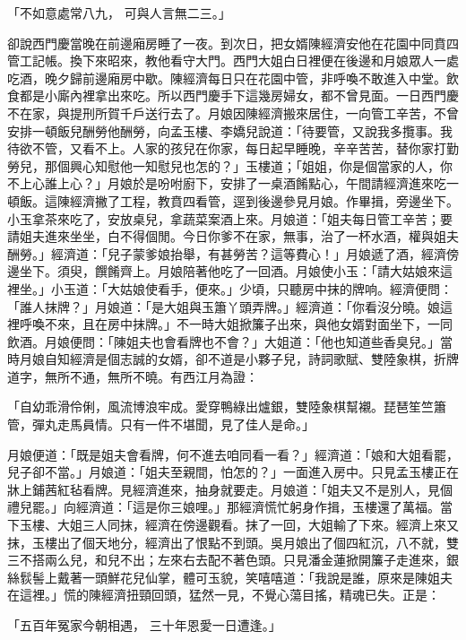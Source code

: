 「不如意處常八九，  可與人言無二三。」

卻說西門慶當晚在前邊廂房睡了一夜。到次日，把女婿陳經濟安他在花園中同賁四管工記帳。換下來昭來，教他看守大門。西門大姐白日裡便在後邊和月娘眾人一處吃酒，晚夕歸前邊廂房中歇。陳經濟每日只在花園中管，非呼喚不敢進入中堂。飲食都是小廝內裡拿出來吃。所以西門慶手下這幾房婦女，都不曾見面。一日西門慶不在家，與提刑所賀千戶送行去了。月娘因陳經濟搬來居住，一向管工辛苦，不曾安排一頓飯兒酬勞他酬勞，向孟玉樓、李嬌兒說道：「待要管，又說我多攬事。我待欲不管，又看不上。人家的孩兒在你家，每日起早睡晚，辛辛苦苦，替你家打勤勞兒，那個興心知慰他一知慰兒也怎的？」玉樓道；「姐姐，你是個當家的人，你不上心誰上心？」月娘於是吩咐廚下，安排了一桌酒餚點心，午間請經濟進來吃一頓飯。這陳經濟撇了工程，教賁四看管，逕到後邊參見月娘。作畢揖，旁邊坐下。小玉拿茶來吃了，安放桌兒，拿蔬菜案酒上來。月娘道：「姐夫每日管工辛苦；要請姐夫進來坐坐，白不得個閒。今日你爹不在家，無事，治了一杯水酒，權與姐夫酬勞。」經濟道：「兒子蒙爹娘抬舉，有甚勞苦？這等費心！」月娘遞了酒，經濟傍邊坐下。須臾，饌餚齊上。月娘陪著他吃了一回酒。月娘使小玉：「請大姑娘來這裡坐。」小玉道：「大姑娘使看手，便來。」少頃，只聽房中抹的牌响。經濟便問：「誰人抹牌？」月娘道：「是大姐與玉簫丫頭弄牌。」經濟道：「你看沒分曉。娘這裡呼喚不來，且在房中抹牌。」不一時大姐掀簾子出來，與他女婿對面坐下，一同飲酒。月娘便問：「陳姐夫也會看牌也不會？」大姐道：「他也知道些香臭兒。」當時月娘自知經濟是個志誠的女婿，卻不道是小夥子兒，詩詞歌賦、雙陸象棋，折牌道字，無所不通，無所不曉。有西江月為證：

「自幼乖滑伶俐，風流博浪牢成。愛穿鴨綠出爐銀，雙陸象棋幫襯。琵琶笙竺簫管，彈丸走馬員情。只有一件不堪聞，見了佳人是命。」

月娘便道：「既是姐夫會看牌，何不進去咱同看一看？」經濟道：「娘和大姐看罷，兒子卻不當。」月娘道：「姐夫至親間，怕怎的？」一面進入房中。只見孟玉樓正在牀上鋪茜紅毡看牌。見經濟進來，抽身就要走。月娘道：「姐夫又不是別人，見個禮兒罷。」向經濟道：「這是你三娘哩。」那經濟慌忙躬身作揖，玉樓還了萬福。當下玉樓、大姐三人同抹，經濟在傍邊觀看。抹了一回，大姐輸了下來。經濟上來又抹，玉樓出了個天地分，經濟出了恨點不到頭。吳月娘出了個四紅沉，八不就，雙三不搭兩么兒，和兒不出；左來右去配不著色頭。只見潘金蓮掀開簾子走進來，銀絲䯼髻上戴著一頭鮮花兒仙掌，體可玉貌，笑嘻嘻道：「我說是誰，原來是陳姐夫在這裡。」慌的陳經濟扭頸回頭，猛然一見，不覺心蕩目搖，精魂已失。正是：

「五百年冤家今朝相遇，  三十年恩愛一日遭逢。」

